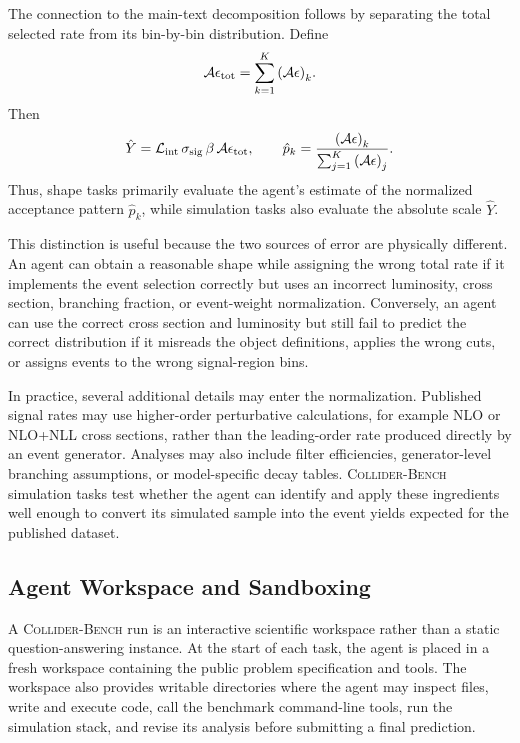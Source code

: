 \documentclass{article}
\newcommand{\ColliderBench}{\textsc{Collider-Bench}}
\begin{document}
The connection to the main-text decomposition follows by separating the total selected rate from its bin-by-bin distribution. Define
\begin{equation}
    \mathcal{A}\epsilon_{\rm tot}
    =
    \sum_{k=1}^K {(\mathcal{A}\epsilon)}_k .
\end{equation}
Then
\begin{equation}
    \hat{Y}
    =
    \mathcal{L}_{\rm int}\,
    {\sigma}_{\rm sig}\,
    \beta\,
    \mathcal{A}\epsilon_{\rm tot},
    \qquad
    \hat{p}_k
    =
    \frac{{(\mathcal{A}\epsilon)}_k}
         {\sum_{j=1}^K {(\mathcal{A}\epsilon)}_j}.
\end{equation}
Thus, shape tasks primarily evaluate the agent's estimate of the normalized acceptance pattern \(\hat{p}_k\), while simulation tasks also evaluate the absolute scale \(\hat{Y}\).

This distinction is useful because the two sources of error are physically different. An agent can obtain a reasonable shape while assigning the wrong total rate if it implements the event selection correctly but uses an incorrect luminosity, cross section, branching fraction, or event-weight normalization. Conversely, an agent can use the correct cross section and luminosity but still fail to predict the correct distribution if it misreads the object definitions, applies the wrong cuts, or assigns events to the wrong signal-region bins.

In practice, several additional details may enter the normalization. Published signal rates may use higher-order perturbative calculations, for example NLO or NLO+NLL cross sections, rather than the leading-order rate produced directly by an event generator. Analyses may also include filter efficiencies, generator-level branching assumptions, or model-specific decay tables. \ColliderBench{} simulation tasks test whether the agent can identify and apply these ingredients well enough to convert its simulated sample into the event yields expected for the published dataset.

\subsection{Agent Workspace and Sandboxing}
\label{sec:workspace-sandbox}

A \ColliderBench{} run is an interactive scientific workspace rather than a static question-answering instance. At the start of each task, the agent is placed in a fresh workspace containing the public problem specification and tools. The workspace also provides writable directories where the agent may inspect files, write and execute code, call the benchmark command-line tools, run the simulation stack, and revise its analysis before submitting a final prediction.
\end{document}
